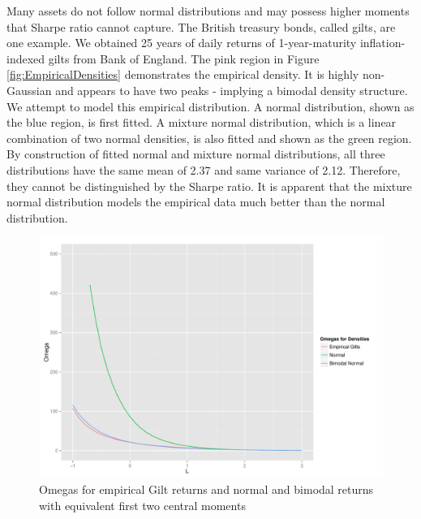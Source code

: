 \documentclass[paper=a4, fontsize=11pt]{scrartcl}
\begin{document}
Many assets do not follow normal distributions and may possess higher moments that Sharpe ratio cannot capture.
The British treasury bonds, called gilts, are one example. We obtained 25 years of daily returns of 1-year-maturity
inflation-indexed gilts from Bank of England. The pink region in Figure \ref{fig:EmpiricalDensities} demonstrates
the empirical density. It is highly non-Gaussian and appears to have two peaks - implying a bimodal density structure.
We attempt to model this empirical distribution. A normal distribution, shown as the blue region, is first fitted.
A mixture normal distribution, which is a linear combination of two normal densities, is also fitted and shown as the
green region. By construction of fitted normal and mixture normal distributions, all three distributions have the
same mean of 2.37 and same variance of 2.12. Therefore, they cannot be distinguished by the 	Sharpe ratio.
It is apparent that the mixture normal distribution models the empirical data much better than the normal distribution.

\begin{figure}[H]
\begin{center}
\includegraphics[width=6in]{plots/EmpiricalOmegas.pdf}
\caption{Omegas for empirical Gilt returns and normal and bimodal returns with equivalent first two central moments}
\label{fig:EmpiricalOmegas}
\end{center}
\end{figure}
\end{document}
